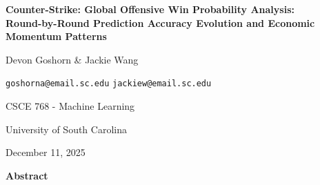 \documentclass[11pt]{article}
\begin{document}
\begin{titlepage}
    \centering
    \vspace*{2cm}

    {\Huge\bfseries Counter-Strike: Global Offensive Win Probability Analysis:\\[0.5cm]
    Round-by-Round Prediction Accuracy Evolution and Economic Momentum Patterns\par}

    \vspace{2cm}

    {\Large Devon Goshorn \quad \& \quad Jackie Wang\par}
    \vspace{0.3cm}
    {\large \texttt{goshorna@email.sc.edu} \quad \texttt{jackiew@email.sc.edu}\par}
    \vspace{0.5cm}
    {\large CSCE 768 - Machine Learning\par}
    {\large University of South Carolina\par}
    \vspace{0.5cm}
    {\large December 11, 2025\par}

    \vspace{2cm}

    {\large\bfseries Abstract\par}
    \vspace{0.5cm}


\end{titlepage}
\end{document}
